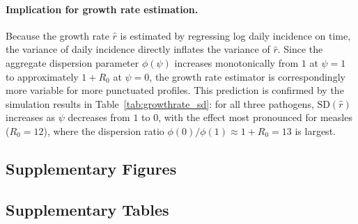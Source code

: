 \paragraph{Implication for growth rate estimation.} Because the growth rate $\hat{r}$ is estimated by regressing log daily incidence on time, the variance of daily incidence directly inflates the variance of $\hat{r}$. Since the aggregate dispersion parameter $\phi(\psi)$ increases monotonically from $1$ at $\psi = 1$ to approximately $1 + R_0$ at $\psi = 0$, the growth rate estimator is correspondingly more variable for more punctuated profiles. This prediction is confirmed by the simulation results in Table~\ref{tab:growthrate_sd}: for all three pathogens, $\text{SD}(\hat{r})$ increases as $\psi$ decreases from $1$ to $0$, with the effect most pronounced for measles ($R_0 = 12$), where the dispersion ratio $\phi(0)/\phi(1) \approx 1 + R_0 = 13$ is largest.

\subsection*{Supplementary Figures}

\subsection*{Supplementary Tables}


